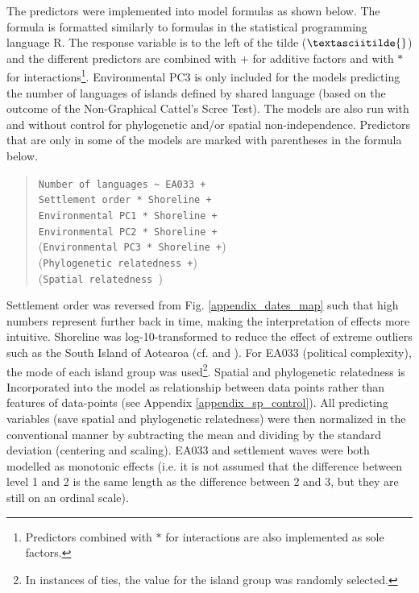 \documentclass[unnumsec,webpdf,modern,medium]{oup-authoring-template}
\begin{document}
The predictors were implemented into model formulas as shown below. The formula is formatted similarly to formulas in the statistical programming language R. The response variable is to the left of the tilde ($\textasciitilde{}$) and the different predictors are combined with + for additive factors and with $\ast$ for interactions\footnote{Predictors combined with $\ast$ for interactions are also implemented as sole factors.}. Environmental PC3 is only included for the models predicting the number of languages of islands defined by shared language (based on the outcome of the Non-Graphical Cattel's Scree Test). The models are also run with and without control for phylogenetic and/or spatial non-independence. Predictors that are only in some of the models are marked with parentheses in the formula below.

\begin{quotation}
\texttt{Number of languages \textasciitilde{} EA033 +} \\
\indent \indent\texttt{Settlement order *  Shoreline +} \\
\indent \indent \texttt{Environmental PC1  *  Shoreline +} \\
\indent \indent\texttt{Environmental PC2  *  Shoreline +} \\
\indent \indent (\texttt{Environmental PC3 *  Shoreline +}) \\
\indent \indent (\texttt{Phylogenetic relatedness +}) \\
\indent \indent (\texttt{Spatial relatedness }) \\
\end{quotation}

Settlement order was reversed from Fig. \ref{appendix_dates_map} such that high numbers represent further back in time, making the interpretation of effects more intuitive. Shoreline was log-10-transformed to reduce the effect of extreme outliers such as the South Island of Aotearoa (cf. \citet{rolett2004environmental} and \citet{atkinson2016cultural}). For EA033 (political complexity), the mode of each island group was used\footnote{In instances of ties, the value for the island group was randomly selected.}. Spatial and phylogenetic relatedness is Incorporated into the model as relationship between data points rather than features of data-points (see Appendix \ref{appendix_sp_control}). All predicting variables (save spatial and phylogenetic relatedness) were then normalized in the conventional manner by subtracting the mean and dividing by the standard deviation (centering and scaling). EA033 and settlement waves were both modelled as monotonic effects (i.e. it is not assumed that the difference between level 1 and 2 is the same length as the difference between 2 and 3, but they are still on an ordinal scale).
\end{document}
